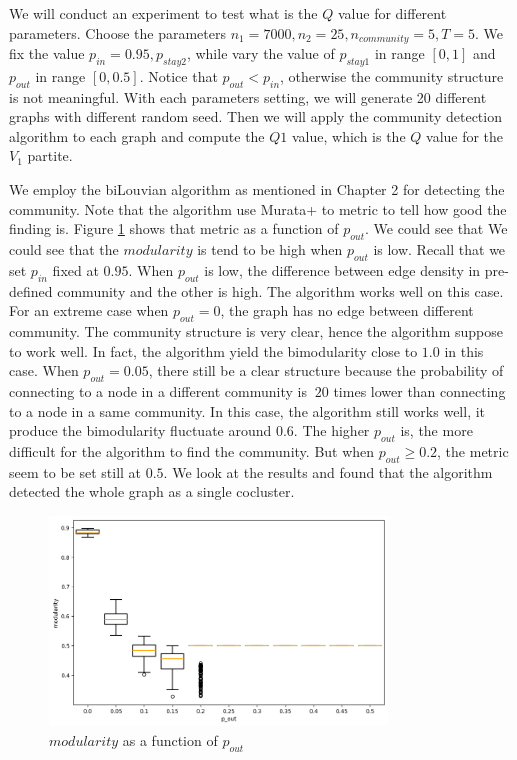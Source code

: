 
We will conduct an experiment to test what is the $Q$ value for different parameters.
Choose the parameters $n_1 = 7000, n_2 = 25, n_{community} = 5, T=5$.
We fix the value $p_{in} = 0.95, p_{stay2}$, while vary the value of $p_{stay1}$ in range $[0, 1]$ and $p_{out}$ in range $[0, 0.5]$.
Notice that $p_{out} < p_{in}$, otherwise the community structure is not meaningful.
With each parameters setting, we will generate 20 different graphs with different random seed.
Then we will apply the community detection algorithm to each graph and compute the $Q1$ value,
which is the $Q$ value for the $V_1$ partite.

We employ the biLouvian algorithm as mentioned in Chapter 2 for detecting the community.
Note that the algorithm use Murata+ to metric to tell how good the finding is.
Figure \ref{fig:modularity_pout} shows that metric as a function of $p_{out}$.
We could see that 
We could see that the $modularity$ is tend to be high when $p_{out}$ is low.
Recall that we set $p_{in}$ fixed at $0.95$.
When $p_{out}$ is low, the difference between edge density in pre-defined community and the other is high.
The algorithm works well on this case.
For an extreme case when $p_{out} = 0$, the graph has no edge between different community.
The community structure is very clear, hence the algorithm suppose to work well.
In fact, the algorithm yield the bimodularity close to $1.0$ in this case.
When $p_{out} = 0.05$, there still be a clear structure because the probability
of connecting to a node in a different community is $~20$ times lower than
connecting to a node in a same community.
In this case, the algorithm still works well, it produce the bimodularity fluctuate around $0.6$.
The higher $p_{out}$ is, the more difficult for the algorithm to find the community.
But when $p_{out} \ge 0.2$, the metric seem to be set still at $0.5$.
We look at the results and found that the algorithm detected the whole graph as a single cocluster.

\begin{figure}[H]
	\centering
	\includegraphics[width=0.8\textwidth]{images/modularity_pout.png}
	\caption{$modularity$ as a function of $p_{out}$ }
	\label{fig:modularity_pout}
\end{figure}

